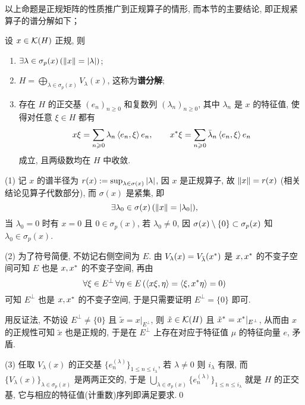 	以上命题是正规矩阵的性质推广到正规算子的情形, 而本节的主要结论, 即正规紧算子的谱分解如下；

    \begin{Theorem}[正规紧算子的谱分解]
        设 $ x\in\mathcal{K}(H) $ 正规, 则
        \begin{enumerate}[(1)]
            \item $ \exists\lambda\in\sigma_p(x)\,(\left\| x \right\|=\left| \lambda \right| ) $;
            \item $ H=\bigoplus_{\lambda\in\sigma_p(x)}V_\lambda(x) $, 这称为\textbf{谱分解};
            \item 存在 $ H $ 的正交基 $ (e_n)_{n\geqslant 0} $ 和复数列 $ (\lambda_n)_{n\geqslant 0} $, 其中 $ \lambda_n $ 是 $ x $ 的特征值, 使得对任意 $ \xi\in H $ 都有
            \[
                x\xi=\sum_{n\geqslant 0}\lambda_n\left\langle e_n,\xi \right\rangle e_n,\qquad x^{*}\xi=\sum_{n\geqslant 0}\bar{\lambda}_n\left\langle e_n,\xi \right\rangle e_n
            \]
            成立, 且两级数均在 $ H $ 中收敛.
        \end{enumerate}
    \end{Theorem}
    \begin{Proof}
        (1) 记 $ x $ 的谱半径为 $ r(x):=\sup_{\lambda\in\sigma(x)}\left| \lambda \right|  $, 因 $ x $ 是正规算子, 故 $ \left\| x \right\|=r(x) $ (相关结论见算子代数部分), 而 $ \sigma(x) $ 是紧集, 即
        \[
            \exists\lambda_0\in\sigma(x)\,(\left\| x \right\|=\left| \lambda_0 \right| ),
        \]
        当 $ \lambda_0=0 $ 时有 $ x=0 $ 且 $ 0\in\sigma_p(x) $, 若 $ \lambda_0\ne 0 $, 因 $ \sigma(x)\setminus\{0\}\subset\sigma_p(x) $ 知 $ \lambda_0\in\sigma_p(x) $.
        
        (2) 为了符号简便, 不妨记右侧空间为 $ E $. 由 $ V_\lambda(x)=V_{\bar{\lambda}}(x^{*}) $ 是 $ x,x^{*} $ 的不变子空间可知 $ E $ 也是 $ x,x^{*} $ 的不变子空间, 再由
        \[
            \forall\xi\in E^\bot\,\forall\eta\in E\,(\left\langle x\xi,\eta \right\rangle=\left\langle \xi,x^{*}\eta \right\rangle=0)
        \]
        可知 $ E^\bot $ 也是 $ x,x^{*} $ 的不变子空间, 于是只需要证明 $ E^\bot=\{0\} $ 即可.

        用反证法, 不妨设 $ E^\bot\ne\{0\} $ 且 $ \tilde{x}=x|_{E^\bot} $, 则 $ \tilde{x}\in\mathcal{K}(H) $ 且 $ \tilde{x}^{*}=x^{*}|_{E^\bot} $, 从而由 $ x $ 的正规性可知 $ \tilde{x} $ 也是正规的, 于是在 $ E^\bot $ 上存在对应于特征值 $ \mu $ 的特征向量 $ e $, 矛盾.

        (3) 任取 $ V_\lambda(x) $ 的正交基 $ \{e_n^{(\lambda)}\}_{1\leqslant n\leqslant i_\lambda} $, 若 $ \lambda\ne 0 $ 则 $ i_\lambda $ 有限, 而 $ \{V_\lambda(x)\}_{\lambda\in\sigma_p(x)} $ 是两两正交的, 于是 $ \bigcup_{\lambda\in\sigma_p(x)}\{e_n^{(\lambda)}\}_{1\leqslant n\leqslant i_\lambda} $ 就是 $ H $ 的正交基, 它与相应的特征值(计重数)序列即满足要求.\qed
	\end{Proof}

